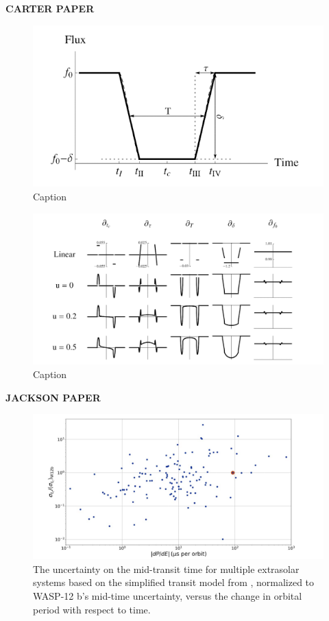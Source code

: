 \documentclass[oneside,12pt]{amsart}
\numberwithin{page}{section}
\begin{document}
\clearpage


\textbf{CARTER PAPER}

\begin{figure}[htbp]
    \centering
    \includegraphics[width=0.5\linewidth]{figs/carter_fig1.png}
    \caption{Caption}
    \label{fig:enter-label}
\end{figure}

\begin{figure}[htbp]
    \centering
    \includegraphics[width=0.5\linewidth]{figs/carter_fig2.png}
    \caption{Caption}
    \label{fig:enter-label}
\end{figure}

\clearpage


\textbf{JACKSON PAPER}

\begin{figure}[htbp]
    \centering
    \includegraphics[width=\linewidth]{figs/jackson_fig1.png}
    \caption{The uncertainty on the mid-transit time for multiple extrasolar systems based on the simplified transit model from \citet{carter2008analytic}, normalized to WASP-12 b's mid-time uncertainty, versus the change in orbital period with respect to time.}
    \label{fig:jackson-fig1}
\end{figure}
\end{document}
